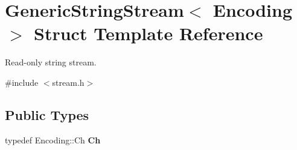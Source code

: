 \hypertarget{structGenericStringStream}{}\section{Generic\+String\+Stream$<$ Encoding $>$ Struct Template Reference}
\label{structGenericStringStream}


Read-\/only string stream.  




{\ttfamily \#include $<$stream.\+h$>$}

\subsection*{Public Types}
\begin{DoxyCompactItemize}
\item 
typedef Encoding\+::\+Ch {\bfseries Ch}\hypertarget{structGenericStringStream_a4289aca895330084ff3168e37e4f08bd}{}\label{structGenericStringStream_a4289aca895330084ff3168e37e4f08bd}

\end{DoxyCompactItemize}
